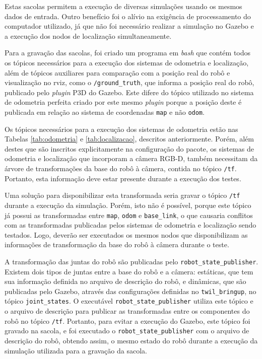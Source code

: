 \documentclass[repeatfields,xlists,xpacks,oneside,yearsonly]{ufrgscca}
\begin{document}
Estas sacolas permitem a execução de diversas simulações usando os
mesmos dados de entrada. Outro benefício foi o alívio na exigência de
processamento do computador utilizado, já que não foi necessário
realizar a simulação no Gazebo e a execução dos nodos de localização
simultaneamente.

Para a gravação das sacolas, foi criado um programa em \textit{bash}
que contém todos os tópicos necessários para a execução dos sistemas
de odometria e localização, além de tópicos auxiliares para
comparação com a posição real do robô e visualização no rviz, como o
\texttt{/ground\_truth}, que informa a posição real do robô,
publicado pelo \textit{plugin} P3D do Gazebo. Este difere do tópico
utilizado no sistema de odometria perfeita criado por este mesmo
\textit{plugin} porque a posição deste é publicada em relação ao
sistema de coordenadas \texttt{map} e não \texttt{odom}.

Os tópicos necessários para a execução dos sistemas de odometria
estão nas Tabelas \ref{tab:odometria} e \ref{tab:localizacao},
descritos anteriormente. Porém, além destes que são inscritos
explicitamente na configuração do pacote, os sistemas de odometria e
localização que incorporam a câmera RGB-D, também necessitam da
árvore de transformações da base do robô à câmera, contida no tópico
\texttt{/tf}. Portanto, esta informação deve estar presente durante a
execução dos testes.

Uma solução para disponibilizar esta transformada seria gravar o
tópico \texttt{/tf} durante a execução da simulação. Porém, isto não
é possível, porque este tópico já possui as transformadas entre
\texttt{map}, \texttt{odom} e \texttt{base\_link}, o que causaria
conflitos com as transformadas publicadas pelos sistemas de odometria
e localização sendo testados. Logo, deverão ser executados os mesmos
nodos que disponibilizam as informações de transformação da base do
robô à câmera durante o teste.

A transformação das juntas do robô são publicadas pelo
\texttt{robot\_state\_publisher}. Existem dois tipos de juntas entre
a base do robô e a câmera: estáticas, que tem sua informação definida
no arquivo de descrição do robô, e dinâmicas, que são publicadas pelo
Gazebo, através das configurações definidas no
\texttt{twil\_bringup}, no tópico \texttt{joint\_states}. O
executável \texttt{robot\_state\_publisher} utiliza este tópico e o
arquivo de descrição para publicar as transformadas entre os
componentes do robô no tópico \texttt{/tf}. Portanto, para evitar a
execução do Gazebo, este tópico foi gravado na sacola, e foi
executado o \texttt{robot\_state\_publisher} com o arquivo de
descrição do robô, obtendo assim, o mesmo estado do robô durante a
execução da simulação utilizada para a gravação da sacola.
\end{document}
